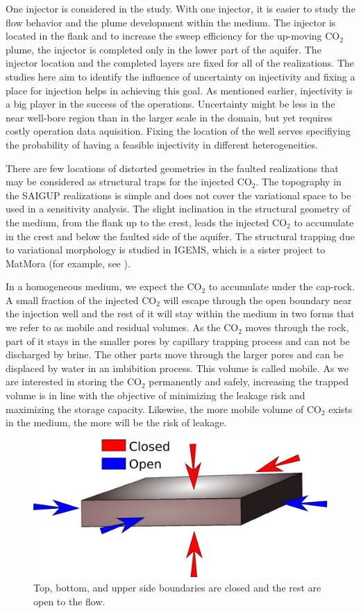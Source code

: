 One injector is considered in the study. With one injector, it is easier to
study the flow behavior and the plume development within the medium. The
injector is
located in the flank and to increase the sweep efficiency for the
up-moving $\mbox{CO}_2$ plume, the injector is completed only in the lower part
of
the aquifer. The injector location and the completed layers are fixed for all of
the realizations. The studies here aim to identify the influence of uncertainty
on injectivity and fixing a place for injection helps in achieving this goal. As mentioned earlier, injectivity is a big player in the success of the operations. Uncertainty might be less in the near well-bore region than in the larger scale in the domain, but yet requires costly operation data aquisition. Fixing the location of the well serves specifiying the probability of having a feasible injectivity in different heterogeneities.

There are few locations of distorted geometries in the faulted realizations that
may be considered as structural traps for the injected $\mbox{CO}_2$. The
topography in the SAIGUP realizations is simple and does not cover the
variational space to be used in a sensitivity analysis. The slight inclination
in the structural geometry of the medium, from the flank up to the crest, leads
the injected $\mbox{CO}_2$  to accumulate in the crest and below the faulted
side of the aquifer. The structural trapping due to variational morphology is
studied in IGEMS, which is a sister project to MatMora (for example, see
\cite{syversveenstudy}). 

In a homogeneous medium, we expect the $\mbox{CO}_2$ to accumulate under the
cap-rock. A small fraction of the injected $\mbox{CO}_2$ will escape through the
open boundary near the injection well and the rest of it will stay within the
medium in two forms that we refer to as  mobile and residual volumes. As
the $\mbox{CO}_2$ moves through the rock, part of it stays in the smaller pores
by capillary trapping process and can not be discharged by brine. The other
parts move through the larger pores and can be displaced by water in an
imbibition process. This volume is called mobile. As we are interested in
storing the $\mbox{CO}_2$ permanently and safely, increasing the trapped volume
is in line with the objective of minimizing the leakage risk and maximizing the
storage capacity. Likewise, the more mobile volume of $\mbox{CO}_2$ exists in
the medium, the more will be the risk of leakage. 

\begin{figure}
 \centering{}
 \includegraphics[width=0.6\linewidth]{./figurer/boundaries}
 \caption{Top, bottom, and upper side boundaries are closed and the rest
are open to the flow.}
 \label{fig:BDRY}
\end{figure}

